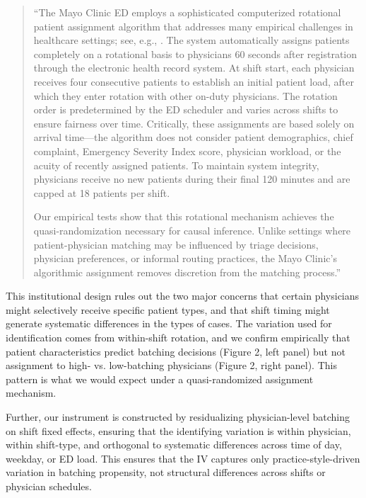 \documentclass[11pt]{article}
\newcommand{\1}{\hbox{\rm 1\kern-.35em 1}}
\begin{document}
\begin{quote}
``The Mayo Clinic ED employs a sophisticated computerized rotational patient assignment algorithm that addresses many empirical challenges in healthcare settings; see, e.g., \cite{Traub2016, traub2016emergency, Traub2018}. The system automatically assigns patients completely on a rotational basis to physicians 60 seconds after registration through the electronic health record system. At shift start, each physician receives four consecutive patients to establish an initial patient load, after which they enter rotation with other on-duty physicians. The rotation order is predetermined by the ED scheduler and varies across shifts to ensure fairness over time. Critically, these assignments are based solely on arrival time---the algorithm does not consider patient demographics, chief complaint, Emergency Severity Index score, physician workload, or the acuity of recently assigned patients. To maintain system integrity, physicians receive no new patients during their final 120 minutes and are capped at 18 patients per shift.

Our empirical tests show that this rotational mechanism achieves the quasi-randomization necessary for causal inference. Unlike settings where patient-physician matching may be influenced by triage decisions, physician preferences, or informal routing practices, the Mayo Clinic's algorithmic assignment removes discretion from the matching process.''
\end{quote}

This institutional design rules out the two major concerns that certain physicians might selectively receive specific patient types, and that shift timing might generate systematic differences in the types of cases. The variation used for identification comes from within-shift rotation, and we confirm empirically that patient characteristics predict batching decisions (Figure 2, left panel) but not assignment to high- vs. low-batching physicians (Figure 2, right panel). This pattern is what we would expect under a quasi-randomized assignment mechanism.

Further, our instrument is constructed by residualizing physician-level batching on shift fixed effects, ensuring that the identifying variation is within physician, within shift-type, and orthogonal to systematic differences across time of day, weekday, or ED load. This ensures that the IV captures only practice-style-driven variation in batching propensity, not structural differences across shifts or physician schedules.
\end{document}
